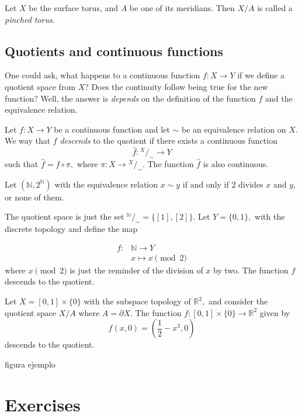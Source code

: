 \documentclass[
	fontsize=10pt, %
	twoside=false, %
	secnumdepth=1, %
]{kaobook}
\begin{document}
\begin{example}
Let $X$ be the surface torus, and $A$ be one of its meridians. Then $X/A$ is called a \emph{pinched torus}.
\end{example}


\subsection{Quotients and continuous functions}

One could ask, what happens to a continuous function $f: X\to Y$ if we define a quotient space from $X$? Does the continuity follow being true for the new function? Well, the answer is \textit{depends} on the definition of the function $f$ and the equivalence relation.

\begin{definition}
Let $f: X\to Y$ be a continuous function and let $\sim$ be an equivalence relation on $X.$ We way that $f$ \emph{descends} to the quotient if there exists a continuous function $$\hat{f}:{}^X/_\sim \to Y$$ such that $\hat{f}=f\circ \pi,$ where $\pi: X\to {}^X/_\sim.$ The function $\hat{f}$ is also continuous.
\end{definition} 


\begin{example}
Let $(\mathbb{N},2^{\mathbb{N}})$ with the equivalence relation $x\sim y$ if and only if 2 divides $x$ and $y,$ or none of them.

The quotient space is just the set ${}^{\mathbb{N}}/_\sim=\{[1],[2]\}.$ Let $Y=\{0,1\},$ with the discrete topology and define the map

\begin{eqnarray*}
f: & \mathbb{N} \to Y \\
& x\mapsto x\pmod 2
\end{eqnarray*} where $x\pmod 2$ is just the reminder of the division of $x$ by two. The function $f$ descends to the quotient.
\end{example}

\begin{example}
Let $X=[0,1]\times\{0\}$ with the subspace topology of $\mathbb{R}^2,$ and consider the quotient space $X/A$ where $A=\partial X.$ The function $f:[0,1]\times\{0\} \to \mathbb{R}^2$ given by $$f(x,0)=\left(\frac{1}{2}-x^3,0\right)$$ descends to the quotient. 

figura ejemplo 
\end{example}

\section{Exercises}
\end{document}
